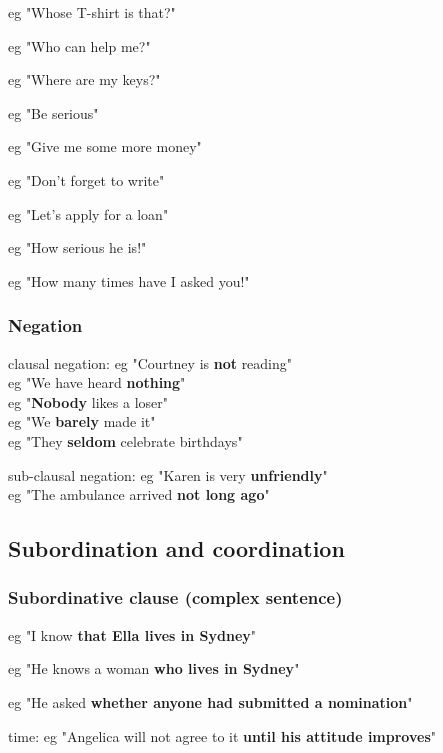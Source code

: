 eg "Whose T-shirt is that?"

eg "Who can help me?"

eg "Where are my keys?"


eg "Be serious"

eg "Give me some more money"

eg "Don't forget to write"

eg "Let's apply for a loan"


eg "How serious he is!"

eg "How many times have I asked you!"

\subsubsection{Negation}

clausal negation:  eg "Courtney is \textbf{not} reading"\\
                   eg "We have heard \textbf{nothing}"\\
                   eg "\textbf{Nobody} likes a loser"\\
                   eg "We \textbf{barely} made it"\\
                   eg "They \textbf{seldom} celebrate birthdays"

sub-clausal negation:  eg "Karen is very \textbf{unfriendly}"\\
                      eg "The ambulance arrived \textbf{not long ago}"

\subsection{Subordination and coordination}

\subsubsection{Subordinative clause (complex sentence)}

eg "I know \textbf{that Ella lives in Sydney}"

eg "He knows a woman \textbf{who lives in Sydney}"

eg "He asked \textbf{whether anyone had submitted a nomination}"


time:  eg "Angelica will not agree to it \textbf{until his attitude improves}"

